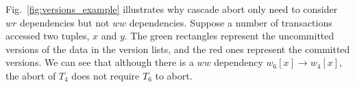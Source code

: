 \documentclass[conference]{IEEEtran}
\begin{document}
Fig.~\ref{fig:versions_example} illustrates why cascade abort only need to consider $wr$ dependencies but not $ww$ dependencies. %
Suppose a number of transactions accessed two tuples, ${x}$ and ${y}$.
The green rectangles represent the uncommitted versions of the data in the version lists, and the red ones represent the committed versions.
We can see that although there is a ${ww}$ dependency ${w_6[x] \rightarrow w_4[x]}$,
the abort of $T_4$ does not require ${T_6}$ to abort.
\begin{figure}[tbp]
  \centering
\end{figure}
\end{document}
